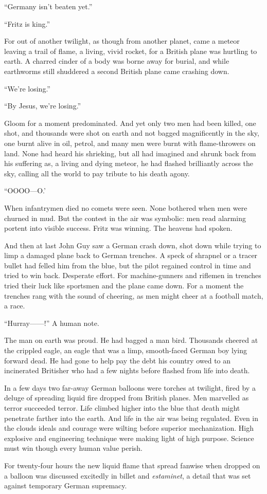 ``Germany isn't beaten yet.''

``Fritz is king.''

For out of another twilight, as though from another planet, came a meteor leaving a trail of flame, a living, vivid rocket, for a British plane was hurtling to earth. A charred cinder of a body was borne away for burial, and while earthworms still shuddered a second British plane came crashing down.

``We're losing.''

``By Jesus, we're losing.''

Gloom for a moment predominated. And yet only two men had been killed, one shot, and thousands were shot on earth and not bagged magnificently in the sky, one burnt alive in oil, petrol, and many men were burnt with flame-throwers on land. None had heard his shrieking, but all had imagined and shrunk back from his suffering as, a living and dying meteor, he had flashed brilliantly across the sky, calling all the world to pay tribute to his death agony.

``OOOO---O.'

When infantrymen died no comets were seen. None bothered when men were churned in mud. But the contest in the air was symbolic: men read alarming portent into visible success. Fritz was winning. The heavens had spoken.

And then at last John Guy saw a German crash down, shot down while trying to limp a damaged plane back to German trenches. A speck of shrapnel or a tracer bullet had felled him from the blue, but the pilot regained control in time and tried to win back. Desperate effort. For machine-gunners and riflemen in trenches tried their luck like sportsmen and the plane came down. For a moment the trenches rang with the sound of cheering, as men might cheer at a football match, a race.

``Hurray------!'' A human note.

The man on earth was proud. He had bagged a man bird. Thousands cheered at the crippled eagle, an eagle that was a limp, smooth-faced German boy lying forward dead. He had gone to help pay the debt his country owed to an incinerated Britisher who had a few nights before flashed from life into death.

In a few days two far-away German balloons were torches at twilight, fired by a deluge of spreading liquid fire dropped from British planes. Men marvelled as terror succeeded terror. Life climbed higher into the blue that death might penetrate farther into the earth. And life in the air was being regulated. Even in the clouds ideals and courage were wilting before superior mechanization. High explosive and engineering technique were making light of high purpose. Science must win though every human value perish.

For twenty-four hours the new liquid flame that spread fanwise when dropped on a balloon was discussed excitedly in billet and \textit{estaminet}, a detail that was set against temporary German supremacy.